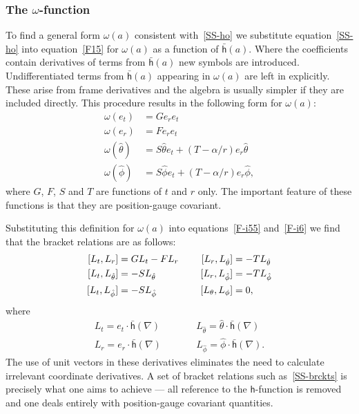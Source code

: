 \documentclass[a4paper]{article}
\numberwithin{equation}{section}
\newcommand{\hs}[1]{\hspace*{#1cm}}
\newcommand{\barr}{\begin{array}}
\newcommand{\earr}{\end{array}}
\newcommand{\dt}{\! \cdot \!}
\newcommand{\eqv}{=}
\newcommand{\alp}{\alpha}
\newcommand{\om}{\omega}
\newcommand{\lih}{\mathsf{h}}
\newcommand{\lbh}{\bar{\mathsf{h}}}
\newcommand{\ho}{\lbh}
\newcommand{\grad}{\nabla}
\newcommand{\phht}{{\hat{\phi}}}
\newcommand{\thht}{{\hat{\theta}}}
\begin{document}
\subsubsection*{The {\boldmath $\om$}-function}

To find a general form $\om(a)$ consistent with~\eqref{SS-ho} we
substitute equation~\eqref{SS-ho} into equation~\eqref{F15} for
$\om(a)$ as a function of $\ho(a)$.  Where the coefficients contain
derivatives of terms from $\ho(a)$ new symbols are introduced.
Undifferentiated terms from $\ho(a)$ appearing in $\om(a)$ are left in
explicitly.  These arise from frame derivatives and the algebra is
usually simpler if they are included directly.  This procedure results
in the following form for $\om(a)$:
%
\begin{equation}
\begin{aligned}
\om(e_t) &= G e_r e_t \\
\om(e_r) &= F e_r e_t \\
\om(\thht) &= S \thht e_t + (T-\alp /r)e_r \thht \\
\om(\phht) &= S \phht e_t + (T-\alp /r)e_r \phht,
\label{SS-om}
\end{aligned}
\end{equation}
%
where $G$, $F$, $S$ and $T$ are functions of $t$ and $r$ only.  The
important feature of these functions is that they are position-gauge
covariant.  


Substituting this definition for $\om(a)$ into equations~\eqref{F-i55}
and~\eqref{F-i6} we find that the bracket relations are as follows:
%
\begin{equation}
\begin{alignedat}{2}
[L_t, L_r] &= G L_t - F L_r &\qquad [L_r, L_\thht] &= -T L_\thht  \\
{} [L_t, L_\thht] &= -S L_\thht &\hs{0.8} [L_r, L_\phht] &= -T
L_\phht  \\
{} [L_t, L_\phht] &= -S L_\phht  &\hs{0.8} [L_\theta, L_\phi]
&= 0,  
\end{alignedat}
\label{SS-brckts}
\end{equation}
%
where
%
\begin{equation}
\barr{lcl}
L_t \eqv e_t \dt \ho(\grad) & \qquad & L_{\thht} \eqv \thht \dt
\ho(\grad) \\
L_r \eqv e_r\dt \ho(\grad) & \qquad & L_{\phht} \eqv \phht \dt
\ho(\grad). 
\earr
\end{equation}
%
The use of unit vectors in these derivatives eliminates the need to
calculate irrelevant coordinate derivatives.  A set of bracket
relations such as~\eqref{SS-brckts} is precisely what one aims to achieve
--- all reference to the $\lih$-function is removed and one deals
entirely with position-gauge covariant quantities.
\end{document}
